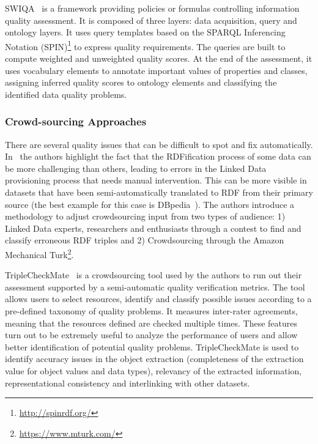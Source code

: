 \documentclass[onecolumn, crcready]{../../Tools/LaTEX/iosart2c}
\begin{document}
SWIQA~\cite{Furber:ECIS:11} is a framework providing policies or formulas controlling information quality assessment. It is composed of three layers: data acquisition, query and ontology layers. It uses query templates based on the SPARQL Inferencing Notation (SPIN)\footnote{\url{http://spinrdf.org/}} to express quality requirements. The queries are built to compute weighted and unweighted quality scores. At the end of the assessment, it uses vocabulary elements to annotate important values of properties and classes, assigning inferred quality scores to ontology elements and classifying the identified data quality problems.

\subsubsection{Crowd-sourcing Approaches}

There are several quality issues that can be difficult to spot and fix automatically. In~\cite{Acosta:ISWC:13} the authors highlight the fact that the RDFification process of some data can be more challenging than others, leading to errors in the Linked Data provisioning process that needs manual intervention. This can be more visible in datasets that have been semi-automatically translated to RDF from their primary source (the best example for this case is DBpedia~\cite{Bizer:WebSemJorunal:09}). The authors introduce a methodology to adjust crowdsourcing input from two types of audience: 1) Linked Data experts, researchers and enthusiasts through a contest to find and classify erroneous RDF triples and 2) Crowdsourcing through the Amazon Mechanical Turk\footnote{\url{https://www.mturk.com/}}.

TripleCheckMate~\cite{Kontokostas:KESW:13} is a crowdsourcing tool used by the authors to run out their assessment supported by a semi-automatic quality verification metrics. The tool allows users to select resources, identify and classify possible issues according to a pre-defined taxonomy of quality problems. It measures inter-rater agreements, meaning that the resources defined are checked multiple times. These features turn out to be extremely useful to analyze the performance of users and allow better identification of potential quality problems. TripleCheckMate is used to identify accuracy issues in the object extraction (completeness of the extraction value for object values and data types), relevancy of the extracted information, representational consistency and interlinking with other datasets.
\end{document}
